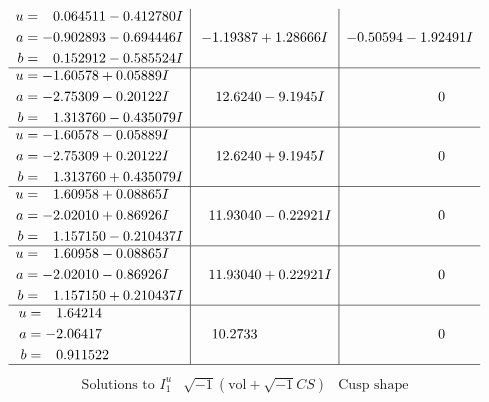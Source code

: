 \documentclass[1p]{elsarticle_modified}
\theoremstyle{definition}
\newcommand{\I}{\sqrt{-1}}
\begin{document}
$$\begin{array}{c|c|c}
\begin{aligned}
u &= \phantom{-}0.064511 - 0.412780 I \\
a &= -0.902893 - 0.694446 I \\
b &= \phantom{-}0.152912 - 0.585524 I\end{aligned}
 & -1.19387 + 1.28666 I & -0.50594 - 1.92491 I \\ \hline\begin{aligned}
u &= -1.60578 + 0.05889 I \\
a &= -2.75309 - 0.20122 I \\
b &= \phantom{-}1.313760 - 0.435079 I\end{aligned}
 & \phantom{-}12.6240 - 9.1945 I & \phantom{-0.000000 } 0 \\ \hline\begin{aligned}
u &= -1.60578 - 0.05889 I \\
a &= -2.75309 + 0.20122 I \\
b &= \phantom{-}1.313760 + 0.435079 I\end{aligned}
 & \phantom{-}12.6240 + 9.1945 I & \phantom{-0.000000 } 0 \\ \hline\begin{aligned}
u &= \phantom{-}1.60958 + 0.08865 I \\
a &= -2.02010 + 0.86926 I \\
b &= \phantom{-}1.157150 - 0.210437 I\end{aligned}
 & \phantom{-}11.93040 - 0.22921 I & \phantom{-0.000000 } 0 \\ \hline\begin{aligned}
u &= \phantom{-}1.60958 - 0.08865 I \\
a &= -2.02010 - 0.86926 I \\
b &= \phantom{-}1.157150 + 0.210437 I\end{aligned}
 & \phantom{-}11.93040 + 0.22921 I & \phantom{-0.000000 } 0 \\ \hline\begin{aligned}
u &= \phantom{-}1.64214\phantom{ +0.000000I} \\
a &= -2.06417\phantom{ +0.000000I} \\
b &= \phantom{-}0.911522\phantom{ +0.000000I}\end{aligned}
 & \phantom{-}10.2733\phantom{ +0.000000I} & \phantom{-0.000000 } 0\\
 \hline 
 \end{array}$$\newpage$$\begin{array}{c|c|c}  
\text{Solutions to }I^u_{1}& \I (\text{vol} + \sqrt{-1}CS) & \text{Cusp shape}\\

\end{array}$$
\end{document}
